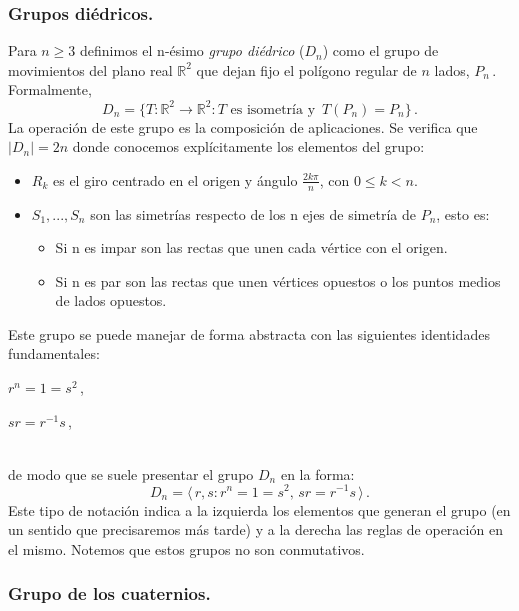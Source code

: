 \subsubsection{Grupos diédricos.}

Para $n \ge 3$ definimos el n-ésimo \textit{grupo diédrico} ($D_n$) como el grupo de movimientos del plano real $\mathbb{R}^2$ que dejan fijo el polígono regular de $n$ lados, $P_n$\,. Formalmente, \begin{equation*}
  D_n = \{T:\mathbb{R}^2 \to \mathbb{R}^2 : T \text{ es isometría y } \,  T(P_n) = P_n\}\,.
\end{equation*} La operación de este grupo es la composición de aplicaciones. Se verifica que $|D_n| = 2n$ donde conocemos explícitamente los elementos del grupo:
\begin{itemize}
  \item $R_k$ es el giro centrado en el origen y ángulo $\frac{2k\pi}{n}$, con $0 \le k < n$.
  \item $S_1,...,S_n$ son las simetrías respecto de los n ejes de simetría de $P_n$, esto es: \begin{itemize}
    \item Si n es impar son las rectas que unen cada vértice con el origen.
    \item Si n es par son las rectas que unen vértices opuestos o los puntos medios de lados opuestos.
  \end{itemize}
\end{itemize}
  
Este grupo se puede manejar de forma abstracta con las siguientes identidades fundamentales:

\begin{itemize*}[label=,itemjoin=\hspace{2em}]
  \item $r^n = 1 = s^2$\,,
  \item $sr = r^{-1}s$\,,
\end{itemize*}\\
de modo que se suele presentar el grupo $D_n$ en la forma: \begin{equation*}
  D_n = \langle\, r,s : r^n = 1 = s^2,\,sr = r^{-1}s\,\rangle\,.
\end{equation*} Este tipo de notación indica a la izquierda los elementos que generan el grupo (en un sentido que precisaremos más tarde) y a la derecha las reglas de operación en el mismo. Notemos que estos grupos no son conmutativos.

\subsubsection{Grupo de los cuaternios.}

